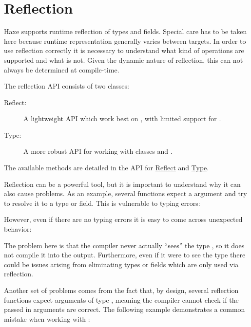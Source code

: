 \section{Reflection}
\label{std-reflection}

Haxe supports runtime reflection of types and fields. Special care has to be taken here because runtime representation generally varies between targets. In order to use reflection correctly it is necessary to understand what kind of operations are supported and what is not. Given the dynamic nature of reflection, this can not always be determined at compile-time.

The reflection API consists of two classes:

\begin{description}
	\item[Reflect:] A lightweight API which work best on , with limited support for . 
	\item[Type:] A more robust API for working with classes and .
\end{description}

The available methods are detailed in the API for \href{http://api.haxe.org//Reflect.html}{Reflect} and \href{http://api.haxe.org//Type.html}{Type}.

Reflection can be a powerful tool, but it is important to understand why it can also cause problems. As an example, several functions expect a  argument and try to resolve it to a type or field. This is vulnerable to typing errors:


However, even if there are no typing errors it is easy to come across unexpected behavior:


The problem here is that the compiler never actually ``sees'' the type , so it does not compile it into the output. Furthermore, even if it were to see the type there could be issues arising from  eliminating types or fields which are only used via reflection.

Another set of problems comes from the fact that, by design, several reflection functions expect arguments of type , meaning the compiler cannot check if the passed in arguments are correct. The following example demonstrates a common mistake when working with :

